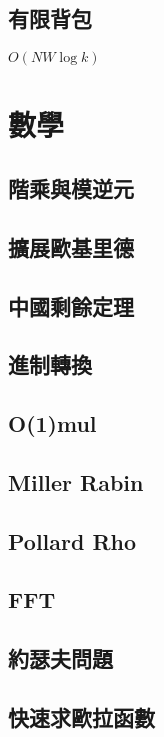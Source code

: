 \documentclass[a4paper,10pt,twocolumn,oneside]{article}
\begin{document}
\subsection{有限背包}
$O(NW\log{k})$



\section{數學}
\subsection{階乘與模逆元}

\subsection{擴展歐基里德}

\subsection{中國剩餘定理}

\subsection{進制轉換}

\subsection{O(1)mul}

\subsection{Miller Rabin}

\subsection{Pollard Rho}

\subsection{FFT}

\subsection{約瑟夫問題}

\subsection{快速求歐拉函數}

\end{document}
